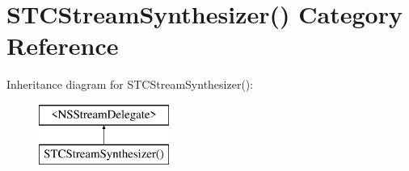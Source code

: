 \hypertarget{category_s_t_c_stream_synthesizer_07_08}{}\section{S\+T\+C\+Stream\+Synthesizer() Category Reference}
\label{category_s_t_c_stream_synthesizer_07_08}
Inheritance diagram for S\+T\+C\+Stream\+Synthesizer()\+:\begin{figure}[H]
\begin{center}
\leavevmode
\includegraphics[height=2.000000cm]{category_s_t_c_stream_synthesizer_07_08}
\end{center}
\end{figure}
